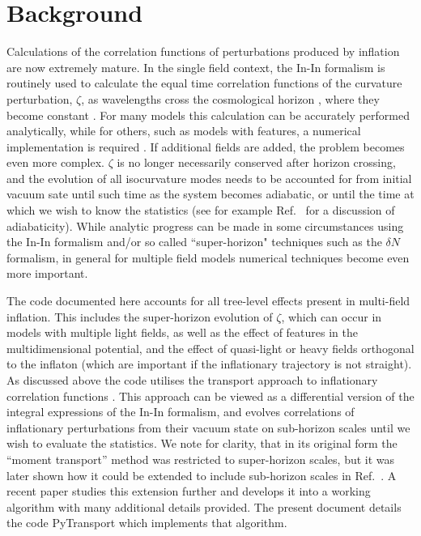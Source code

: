 \documentclass[10pt,
amsmath,amssymb,
aps,prd,nofootinbib,eqsecnum,a4paper]{revtex4}
\begin{document}
\section{Background} 

Calculations of the correlation functions of perturbations produced by inflation 
are now extremely mature.
In the single field context, the In-In formalism is routinely used to calculate the equal time correlation 
functions of the 
curvature perturbation, $\zeta$, as wavelengths cross the cosmological horizon 
\cite{Maldacena:2002vr, Seery:2005wm, Chen:2006nt,Elliston:2012ab}, where they become 
constant \cite{Rigopoulos:2003ak,Lyth:2004gb}. 
For many models this calculation can be accurately performed 
analytically, while for others, such as models with features, 
a numerical implementation is required \cite{Chen:2006xjb,Chen:2008wn,Hazra:2012yn,Funakoshi:2012ms}. 
If additional fields are added, the problem becomes even more complex. $\zeta$ is no longer 
necessarily conserved after horizon crossing, and the evolution of all 
isocurvature modes needs to be accounted for   
from initial vacuum sate until such time as the system becomes adiabatic, or until the time at which we wish to know the statistics  (see for example Ref.~\cite{Elliston:2011dr} 
for a discussion of adiabaticity). While analytic progress can be made in some circumstances 
using the In-In formalism and/or so called ``super-horizon" techniques such as the $\delta N$ formalism, 
in general for multiple field models numerical techniques become even more important. 

The code documented here accounts for all tree-level effects present in multi-field inflation. This includes  
the super-horizon evolution of $\zeta$, which 
can occur in models with multiple light  
fields, as well as the effect of features in the multidimensional potential, and the effect of 
quasi-light or heavy fields orthogonal to the inflaton 
(which are important if the inflationary trajectory is not straight).
As discussed above the code utilises the transport approach to inflationary correlation functions 
\cite{Mulryne:2009kh,Mulryne:2010rp,Dias:2011xy,Anderson:2012em,Seery:2012vj, Mulryne:2013uka}. This approach 
can be viewed as a differential version of the integral expressions of the In-In formalism, 
and evolves correlations of inflationary perturbations from their vacuum state on 
sub-horizon scales until we wish to evaluate the statistics. 
We note for clarity, that in its original form the ``moment transport'' method was restricted 
to super-horizon scales, but it was later shown how it could be extended to include sub-horizon scales 
in Ref.~\cite{Mulryne:2013uka}. A recent paper studies this extension further and develops it into a working 
algorithm \cite{xxx} with many additional details provided. The present document details 
the code PyTransport which implements that algorithm.
\end{document}

